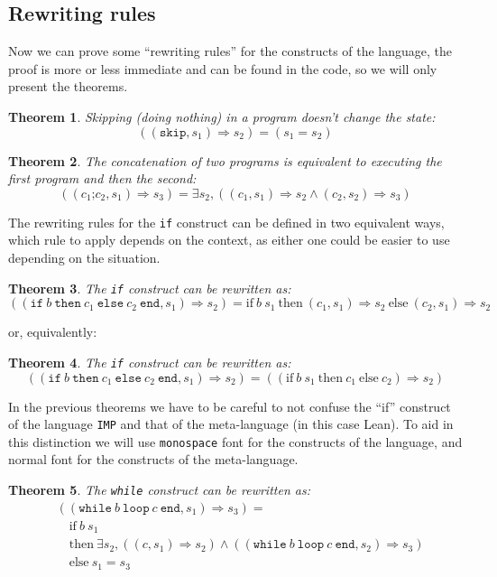 \documentclass[
  a4paper, 
  10pt, 
  parskip=half, 
  DIV=20,
  toc=bibliography,
  usegeometry,
]{scrartcl}
\newtheorem{theorem}{Theorem}[section]
\newcommand{\bigstep}{\Longrightarrow}
\begin{document}
\subsection{Rewriting rules}

Now we can prove some \enquote{rewriting rules} for the constructs of the 
language, the proof is more or less immediate and can be found in the code,
so we will only present the theorems.

\begin{theorem}
  Skipping (doing nothing) in a program doesn't change the state:
  \[
  ((\texttt{skip}, s_1) \bigstep s_2) = (s_1 = s_2)
  \]
\end{theorem}

\begin{theorem}
  The concatenation of two programs is equivalent to executing the first
  program and then the second:
  \[
  ((c_1 \texttt{;} c_2, s_1) \bigstep s_3) = 
  \exists s_2, \left((c_1, s_1) \bigstep s_2 \land (c_2, s_2) \bigstep s_3\right)
  \]
\end{theorem}

The rewriting rules for the \texttt{if} construct can be defined in two equivalent ways,
which rule to apply depends on the context, as either one could be easier to use
depending on the situation.

\begin{theorem}\label{thm:if_rewrite_1}
  The \texttt{if} construct can be rewritten as:
  \[
  ((\texttt{if} \ b \ \texttt{then} \ c_1 \ \texttt{else} \ c_2 \ \texttt{end}, s_1) \bigstep s_2) = 
  \text{if} \ b \ s_1 \ \text{then} \ (c_1, s_1) \bigstep s_2 \ \text{else} \ (c_2, s_1) \bigstep s_2
  \]
\end{theorem}
or, equivalently:
\begin{theorem}\label{thm:if_rewrite_2}
  The \texttt{if} construct can be rewritten as:
  \[
  ((\texttt{if} \ b \ \texttt{then} \ c_1 \ \texttt{else} \ c_2 \ \texttt{end}, s_1) \bigstep s_2) =
  ((\text{if} \ b \ s_1 \ \text{then} \ c_1 \ \text{else} \ c_2) \bigstep s_2)
  \]
\end{theorem}

In the previous theorems we have to be careful to not confuse the \enquote{if}
construct of the language \texttt{IMP} and that of the meta-language (in this case Lean).
To aid in this distinction we will use \texttt{monospace} font for the constructs
of the language, and normal font for the constructs of the meta-language.

\begin{theorem}\label{thm:while_rewrite}
  The \texttt{while} construct can be rewritten as:
  \begin{align*}
  &((\texttt{while} \ b \ \texttt{loop} \ c \ \texttt{end}, s_1) \bigstep s_3) = \\
  &\quad \text{if} \ b \ s_1 \\
  &\quad \text{then} \ \exists s_2, ((c, s_1) \bigstep s_2) \land ((\texttt{while} \ b \ \texttt{loop} \ c \ \texttt{end}, s_2) \bigstep s_3) \\
  &\quad \text{else} \ s_1 = s_3
  \end{align*}
\end{theorem}
\end{document}
